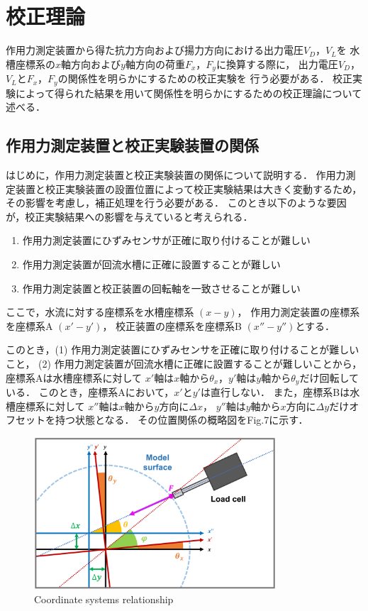 \section{校正理論}
作用力測定装置から得た抗力方向および揚力方向における出力電圧$V_D$，$V_L$を
水槽座標系の$x$軸方向および$y$軸方向の荷重$F_x$，$F_y$に換算する際に，
出力電圧$V_D$，$V_L$と$F_x$，$F_y$の関係性を明らかにするための校正実験を
行う必要がある．
校正実験によって得られた結果を用いて関係性を明らかにするための校正理論について述べる．

\subsection{作用力測定装置と校正実験装置の関係}
はじめに，作用力測定装置と校正実験装置の関係について説明する．
作用力測定装置と校正実験装置の設置位置によって校正実験結果は大きく変動するため，
その影響を考慮し，補正処理を行う必要がある．
このとき以下のような要因が，校正実験結果への影響を与えていると考えられる．

\begin{enumerate}[(1)]
  \item 作用力測定装置にひずみセンサが正確に取り付けることが難しい
  \item 作用力測定装置が回流水槽に正確に設置することが難しい
  \item 作用力測定装置と校正装置の回転軸を一致させることが難しい
\end{enumerate}

ここで，水流に対する座標系を水槽座標系 $(x-y)$，
作用力測定装置の座標系を座標系A $(x'-y')$，
校正装置の座標系を座標系B $(x''-y'')$とする．

このとき，(1) 作用力測定装置にひずみセンサを正確に取り付けることが難しいこと，
(2) 作用力測定装置が回流水槽に正確に設置することが難しいことから，
座標系Aは水槽座標系に対して
$x'$軸は$x$軸から$\theta_x$，$y'$軸は$y$軸から$\theta_y$だけ回転している．
このとき，座標系Aにおいて，$x'$と$y'$は直行しない．
また，座標系Bは水槽座標系に対して
$x''$軸は$x$軸から$y$方向に$\Delta x$，
$y''$軸は$y$軸から$x$方向に$\Delta y$だけオフセットを持つ状態となる．
その位置関係の概略図をFig.7に示す．

\begin{figure}[htbp]
  \begin{center}
    \includegraphics[width=90mm]{images/31-1.png}
    \caption{Coordinate systems relationship}
  \end{center}
\end{figure}

